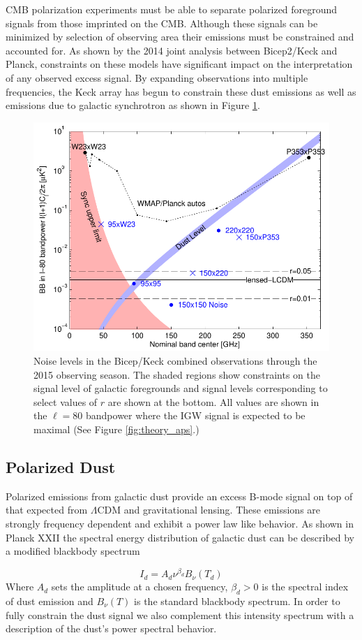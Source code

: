 \documentclass[12pt]{article}
\begin{document}
CMB polarization experiments must be able to separate polarized foreground
signals from those imprinted on the CMB. Although these signals can be
minimized by selection of observing area their emissions must be constrained
and accounted for. As shown by the 2014 joint analysis between Bicep2/Keck and
Planck, constraints on these models have significant impact on the
interpretation of any observed excess signal. By expanding observations into
multiple frequencies, the Keck array has begun to constrain these dust
emissions as well as emissions due to galactic synchrotron as shown in Figure
\ref{fig:noilev}.
\begin{figure}
	\center
	\includegraphics[width=.6\textwidth]{noilev_bk15.pdf}
	\caption{Noise levels in the Bicep/Keck combined observations through the
	2015 observing season. The shaded regions show constraints on the signal
	level of galactic foregrounds and signal levels corresponding to select values
	of $r$ are shown at the bottom. All values are shown in the $\ell=80$
	bandpower where the IGW signal is expected to be maximal (See Figure
	\ref{fig:theory_aps}.)}
	\label{fig:noilev}
\end{figure}

\subsection{Polarized Dust}
Polarized emissions from galactic dust provide an excess B-mode signal on top of
that expected from $\Lambda$CDM and gravitational lensing. These emissions 
are strongly frequency dependent and exhibit a power law like behavior. As shown
in Planck XXII \cite{cite:PlanckXXII} the spectral energy distribution of
galactic dust can be described by a modified blackbody spectrum

\begin{equation}
	I_d=A_d\nu ^{\beta_d} B_{\nu}(T_d)
	\label{eq:dust_sed}
\end{equation}
Where $A_d$ sets the amplitude at a chosen frequency, $\beta _d > 0$ is the spectral
index of dust emission and $B_{\nu}(T)$ is the standard blackbody spectrum. In order
to fully constrain the dust signal we also complement this intensity
spectrum with a description of the dust's power spectral behavior.
\end{document}
